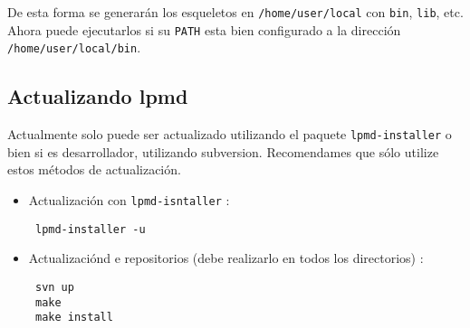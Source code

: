 De esta forma se generar\'an los esqueletos en \verb|/home/user/local| con \verb|bin|, \verb|lib|, etc. Ahora puede ejecutarlos si su \verb|PATH| esta bien configurado a la direcci\'on \verb|/home/user/local/bin|.


\subsection{Actualizando lpmd}

 Actualmente {\lpmd} solo puede ser actualizado utilizando el paquete \verb|lpmd-installer| o bien si es desarrollador, utilizando subversion. Recomendames que s\'olo utilize estos m\'etodos de actualizaci\'on.

\begin{itemize}
 \item Actualizaci\'on con \verb|lpmd-isntaller| :
 \begin{verbatim}
 lpmd-installer -u
 \end{verbatim}
 \item Actualizaci\'ond e repositorios (debe realizarlo en todos los directorios) :
 \begin{verbatim}
 svn up
 make
 make install
 \end{verbatim}
\end{itemize}
